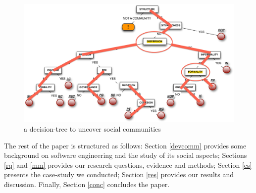 \documentclass[conference]{IEEEtran}
\begin{document}
%

\begin{figure}
\hspace{.5cm}
\includegraphics[width=6.3in]{tree}%
\caption{a decision-tree to uncover social communities \cite{specissue}}\label{tree}
\end{figure}

The rest of the paper is structured as follows: Section \ref{devcomm} provides some background on software engineering and the study of its social aspects; Sections \ref{rq} and \ref{mm} provides our research questions, evidence and methods; Section \ref{cs} presents the case-study we conducted; Section \ref{res} provides our results and discussion. Finally, Section \ref{conc} concludes the paper.
\end{document}
